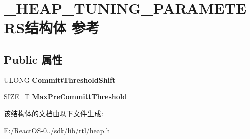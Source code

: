 \hypertarget{struct___h_e_a_p___t_u_n_i_n_g___p_a_r_a_m_e_t_e_r_s}{}\section{\+\_\+\+H\+E\+A\+P\+\_\+\+T\+U\+N\+I\+N\+G\+\_\+\+P\+A\+R\+A\+M\+E\+T\+E\+R\+S结构体 参考}
\label{struct___h_e_a_p___t_u_n_i_n_g___p_a_r_a_m_e_t_e_r_s}
\subsection*{Public 属性}
\begin{DoxyCompactItemize}
\item 
\mbox{\label{struct___h_e_a_p___t_u_n_i_n_g___p_a_r_a_m_e_t_e_r_s_a2434225d8f4fdf66f08676db5496c799}} 
U\+L\+O\+NG {\bfseries Committ\+Threshold\+Shift}
\item 
\mbox{\label{struct___h_e_a_p___t_u_n_i_n_g___p_a_r_a_m_e_t_e_r_s_ace2c43de6473b7a0143bee3cab3721d4}} 
S\+I\+Z\+E\+\_\+T {\bfseries Max\+Pre\+Committ\+Threshold}
\end{DoxyCompactItemize}


该结构体的文档由以下文件生成\+:\begin{DoxyCompactItemize}
\item 
E\+:/\+React\+O\+S-\/0../sdk/lib/rtl/heap.\+h\end{DoxyCompactItemize}
